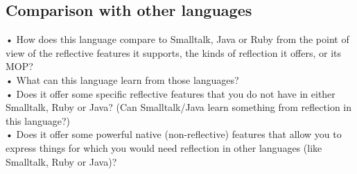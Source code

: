 \subsection{Comparison with other languages}
•	How does this language compare to Smalltalk, Java or Ruby from the point of view of the reflective features it supports, the kinds of reflection it offers, or its MOP?\\
•	What can this language learn from those languages?\\
•	Does it offer some specific reflective features that you do not have in either Smalltalk, Ruby or Java? (Can Smalltalk/Java learn something from reflection in this language?)\\
•	Does it offer some powerful native (non-reflective) features that allow you to express things for which you would need reflection in other languages (like Smalltalk, Ruby or Java)?\\
